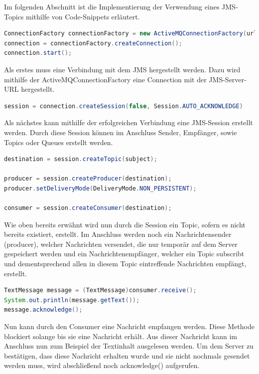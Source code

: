 \documentclass[11pt, a4paper]{article}
\begin{document}
Im folgenden Abschnitt ist die Implementierung der Verwendung eines JMS-Topics mithilfe von Code-Snippets erläutert.

\begin{lstlisting}[language=Java]
ConnectionFactory connectionFactory = new ActiveMQConnectionFactory(url);
connection = connectionFactory.createConnection();
connection.start();
\end{lstlisting}

Als erstes muss eine Verbindung mit dem JMS hergestellt werden. Dazu wird mithilfe der ActiveMQConnectionFactory eine Connection mit der JMS-Server-URL
hergestellt.

\begin{lstlisting}[language=Java]
session = connection.createSession(false, Session.AUTO_ACKNOWLEDGE)
\end{lstlisting}

Als nächstes kann mithilfe der erfolgreichen Verbindung eine JMS-Session erstellt werden. Durch diese Session können im Anschluss Sender, Empfänger, sowie
Topics oder Queues erstellt werden.

\begin{lstlisting}[language=Java]
destination = session.createTopic(subject);

producer = session.createProducer(destination);
producer.setDeliveryMode(DeliveryMode.NON_PERSISTENT);
		
consumer = session.createConsumer(destination);
\end{lstlisting}

Wie oben bereits erwähnt wird nun durch die Session ein Topic, sofern es nicht bereits existiert, erstellt.
Im Anschluss werden noch ein Nachrichtensender (producer), welcher Nachrichten versendet, die nur temporär auf dem Server gespeichert werden und ein Nachrichtenempfänger,
welcher ein Topic subscribt und dementsprechend allen in diesem Topic eintreffende Nachrichten empfängt, erstellt.

\begin{lstlisting}[language=Java]
TextMessage message = (TextMessage)consumer.receive();
System.out.println(message.getText());
message.acknowledge();
\end{lstlisting}

Nun kann durch den Consumer eine Nachricht empfangen werden. Diese Methode blockiert solange bis sie eine Nachricht erhält. Aus dieser Nachricht kann im
Anschluss nun zum Beispiel der Textinhalt ausgelesen werden. Um dem Server zu bestätigen, dass diese Nachricht erhalten wurde und sie nicht nochmals gesendet
werden muss, wird abschließend noch acknowledge() aufgerufen.
\end{document}
